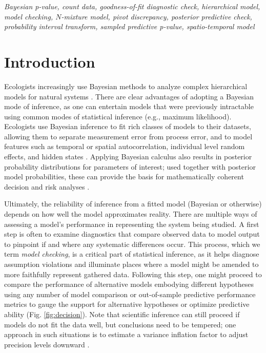 \documentclass[12pt,english]{article}
\begin{document}
\begin{spacing}{1.9}
{\em Bayesian p-value, count data, goodness-of-fit diagnostic check,
  hierarchical model, model checking, $N$-mixture model, pivot
  discrepancy, posterior predictive check, probability interval
  transform, sampled predictive p-value, spatio-temporal model}



\def\VAR{{\rm Var}\,} \def\COV{{\rm Cov}\,} \def\Prob{{\rm P}\,}
\def\bfx{{\bf x}} \def\bfX{{\bf X}} \def\bfY{{\bf Y}\,} \def\bfy{{\bf
    y}} \def\bfZ{{\bf Z}\,} \def\bftheta{\boldsymbol{\theta}}
\def\bfeta{\boldsymbol{\eta}} \def\bfOmega{\boldsymbol{\Omega}}
\def\bfbeta{\boldsymbol{\beta}} \def\bfSigma{\boldsymbol{\Sigma}}
\def\bfmu{\boldsymbol{\mu}} \def\bfnu{\boldsymbol{\nu}}
\def\bfepsilon{\boldsymbol{\epsilon}} \def\R2{\rm I\!R^2}


\section{Introduction}

Ecologists increasingly use Bayesian methods to analyze complex
hierarchical models for natural systems \citep{HobbsHooten2015}.
There are clear advantages of adopting a Bayesian mode of inference,
as one can entertain models that were previously intractable using
common modes of statistical inference (e.g., maximum
likelihood). Ecologists use Bayesian inference to fit rich classes of
models to their datasets, allowing them to separate measurement error
from process error, and to model features such as temporal or spatial
autocorrelation, individual level random effects, and hidden states
\citep{LinkEtAl2002,ClarkBjornstad2004,CressieEtAl2009}. Applying
Bayesian calculus also results in posterior probability distributions
for parameters of interest; used together with posterior model
probabilities, these can provide the basis for mathematically coherent
decision and risk analyses \citep{LinkBarker2006,Berger2013,
  williams2016combining}.

Ultimately, the reliability of inference from a fitted model (Bayesian
or otherwise) depends on how well the model approximates reality.
There are multiple ways of assessing a model's performance in
representing the system being studied. A first step is often to
examine diagnostics that compare observed data to model output to
pinpoint if and where any systematic differences occur. This process,
which we term \textit{model checking}, is a critical part of
statistical inference, as it helps diagnose assumption violations and
illuminate places where a model might be amended to more faithfully
represent gathered data. Following this step, one might proceed to
compare the performance of alternative models embodying different
hypotheses using any number of model comparison or out-of-sample
predictive performance metrics \citep[see][for a
review]{HootenHobbs2015} to gauge the support for alternative
hypotheses or optimize predictive ability (Fig. \ref{fig:decision}).
Note that scientific inference can still proceed if models do not fit
the data well, but conclusions need to be tempered; one approach in
such situations is to estimate a variance inflation factor to adjust
precision levels downward
\citep[e.g.,][]{CoxSnell1989,McCullaghNelder1989}.


\end{spacing}
\end{document}
